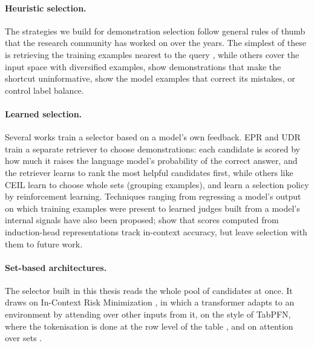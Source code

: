 \paragraph{Heuristic selection.}
The strategies we build for demonstration selection follow general rules of thumb that the research community has worked on over the years. The simplest of these is retrieving the training examples nearest to the query \citep{liu2022what}, while others cover the input space with diversified examples, show demonstrations that make the shortcut uninformative, show the model examples that correct its mistakes, or control label balance.

\newpage
\paragraph{Learned selection.}
Several works train a selector based on a model's own feedback. EPR \citep{rubin2022learning} and UDR \citep{li2023unified} train a separate retriever to choose demonstrations: each candidate is scored by how much it raises the language model's probability of the correct answer, and the retriever learns to rank the most helpful candidates first, while others like CEIL \citep{ye2023compositional} learn to choose whole sets (grouping examples), and \citet{zhang2022active} learn a selection policy by reinforcement learning. Techniques ranging from regressing a model's output on which training examples were present \citep{ilyas2022datamodels} to learned judges built from a model's internal signals \citep{kato2025affinity, wang2026disp} have also been proposed; \citet{kato2025affinity} show that scores computed from induction-head representations track in-context accuracy, but leave selection with them to future work.

\paragraph{Set-based architectures.}
The selector built in this thesis reads the whole pool of candidates at once.
It draws on In-Context Risk Minimization \citep{gupta2024context}, in which a transformer adapts to an environment by attending over other inputs from it, on the style of TabPFN, where the tokenisation is done at the row level of the table \citep{hollmann2023tabpfn}, and on attention over sets \citep{lee2019set}.

